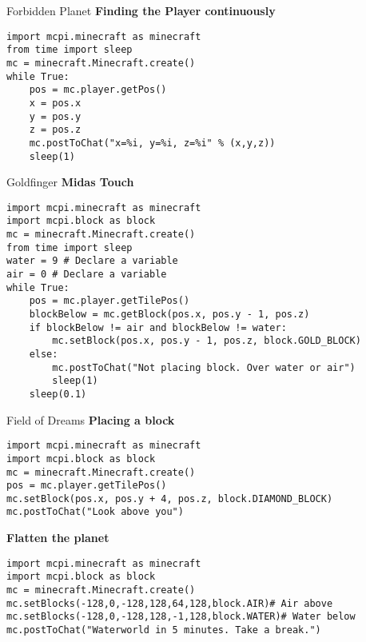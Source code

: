 \documentclass[avery5388,grid]{flashcards}
\begin{document}
\begin{flashcard}[API]{Forbidden Planet}
{\bf Finding the Player continuously}
\begin{lstlisting}
import mcpi.minecraft as minecraft
from time import sleep
mc = minecraft.Minecraft.create()
while True:
    pos = mc.player.getPos()
    x = pos.x
    y = pos.y
    z = pos.z
    mc.postToChat("x=%i, y=%i, z=%i" % (x,y,z))
    sleep(1)
\end{lstlisting}
\end{flashcard}


\begin{flashcard}[API]{Goldfinger}
{\bf Midas Touch}
\begin{lstlisting}
import mcpi.minecraft as minecraft
import mcpi.block as block
mc = minecraft.Minecraft.create()
from time import sleep
water = 9 # Declare a variable
air = 0 # Declare a variable
while True:
    pos = mc.player.getTilePos()
    blockBelow = mc.getBlock(pos.x, pos.y - 1, pos.z)
    if blockBelow != air and blockBelow != water:
        mc.setBlock(pos.x, pos.y - 1, pos.z, block.GOLD_BLOCK)
    else:
        mc.postToChat("Not placing block. Over water or air")
        sleep(1)
    sleep(0.1)
\end{lstlisting}
\end{flashcard}


\begin{flashcard}[API]{Field of Dreams}
{\bf Placing a block}
\begin{lstlisting}
import mcpi.minecraft as minecraft
import mcpi.block as block
mc = minecraft.Minecraft.create()
pos = mc.player.getTilePos()
mc.setBlock(pos.x, pos.y + 4, pos.z, block.DIAMOND_BLOCK)
mc.postToChat("Look above you")
\end{lstlisting}
{\bf Flatten the planet}
\begin{lstlisting}
import mcpi.minecraft as minecraft
import mcpi.block as block
mc = minecraft.Minecraft.create() 
mc.setBlocks(-128,0,-128,128,64,128,block.AIR)# Air above
mc.setBlocks(-128,0,-128,128,-1,128,block.WATER)# Water below
mc.postToChat("Waterworld in 5 minutes. Take a break.")
\end{lstlisting}
\end{flashcard}
\end{document}
